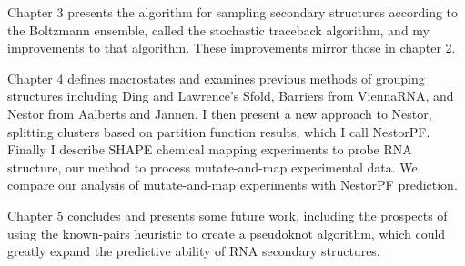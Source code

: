 Chapter 3 presents the algorithm for sampling secondary structures
according to the Boltzmann ensemble, called the stochastic traceback
algorithm, and my improvements to that algorithm. These improvements
mirror those in chapter 2.

Chapter 4 defines macrostates and examines previous methods of
grouping structures including Ding and Lawrence's Sfold, Barriers from
ViennaRNA, and Nestor from Aalberts and Jannen. I then present a new
approach to Nestor, splitting clusters based on partition function
results, which I call NestorPF. Finally I describe SHAPE chemical
mapping experiments to probe RNA structure, our method to process
mutate-and-map experimental data. We compare our analysis of
mutate-and-map experiments with NestorPF prediction.

Chapter 5 concludes and presents some future work, including the
prospects of using the known-pairs heuristic to create a pseudoknot
algorithm, which could greatly expand the predictive ability of RNA
secondary structures.


